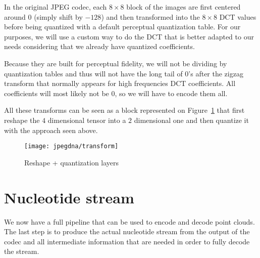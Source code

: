 In the original JPEG codec, each $8 \times 8$ block of the images are first centered around $0$ (simply shift by $-128$) and then transformed into the $8 \times 8$ DCT values before being quantized with a default perceptual quantization table. 
For our purposes, we will use a custom way to do the DCT that is better adapted to our needs considering that we already have quantized coefficients.

Because they are built for perceptual fidelity, we will not be dividing by quantization tables and thus will not have the long tail of $0$'s after the zigzag transform that normally appears for high frequencies DCT coefficients. All coefficients will most likely not be $0$, so we will have to encode them all.

All these transforms can be seen as a block represented on Figure~\ref{fig:reshape+quantization} that first reshape the $4$ dimensional tensor into a $2$ dimensional one and then quantize it with the approach seen above.

\begin{figure}
    \centering
    \texttt{[image: jpegdna/transform]}
    \caption{Reshape + quantization layers}
    \label{fig:reshape+quantization}
\end{figure}

% 

\section{Nucleotide stream}

We now have a full pipeline that can be used to encode and decode point clouds. The last step is to produce the actual nucleotide stream from the output of the codec and all intermediate information that are needed in order to fully decode the stream.

